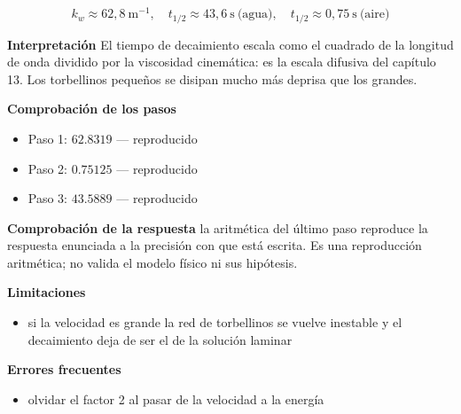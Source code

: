 \documentclass[10pt,openany]{book}
\begin{document}
\begin{tcolorbox}[title={Problema resuelto}, studiumworked, breakable]
\[
k_w \approx 62{,}8\ \mathrm{m^{-1}},\quad t_{1/2} \approx 43{,}6\ \mathrm{s}\ \text{(agua)},\quad t_{1/2} \approx 0{,}75\ \mathrm{s}\ \text{(aire)}
\]

\noindent\textbf{Interpretación}
El tiempo de decaimiento escala como el cuadrado de la longitud de onda dividido por la viscosidad cinemática: es la escala difusiva del capítulo 13. Los torbellinos pequeños se disipan mucho más deprisa que los grandes.

\noindent\textbf{Comprobación de los pasos}
\begin{itemize}
\item Paso 1: $62.8319$ — reproducido
\item Paso 2: $0.75125$ — reproducido
\item Paso 3: $43.5889$ — reproducido
\end{itemize}

\noindent\textbf{Comprobación de la respuesta} la aritmética del último paso reproduce la respuesta enunciada a la precisión con que está escrita. Es una reproducción aritmética; no valida el modelo físico ni sus hipótesis.

\noindent\textbf{Limitaciones}
\begin{itemize}
\item si la velocidad es grande la red de torbellinos se vuelve inestable y el decaimiento deja de ser el de la solución laminar
\end{itemize}

\noindent\textbf{Errores frecuentes}
\begin{itemize}
\item olvidar el factor 2 al pasar de la velocidad a la energía
\end{itemize}
\end{tcolorbox}
\end{document}
